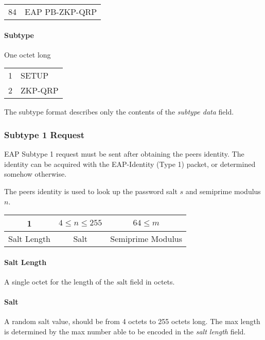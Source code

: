 \bigskip

\begin{tabular}{ll}
	84 & EAP PB-ZKP-QRP \\
\end{tabular}

\paragraph{Subtype} One octet long

\bigskip 

\begin{tabular}{ll}
	1 & SETUP \\ %
	2 & ZKP-QRP \\
\end{tabular}
\bigskip
\newline
The subtype format describes only the contents of the \textit{subtype data} field.

\subsubsection{Subtype 1 Request}

EAP Subtype 1 request must be sent after obtaining the peers identity. The identity can be acquired with the EAP-Identity (Type 1) packet, or determined somehow otherwise.

The peers identity is used to look up the password salt $s$ and semiprime modulus $n$.

\bigskip

\begin{center}
\begin{tabular}{|c|c|c|}
	\hline
	1 & $4 \le n \le 255 $ & $64 \le m$\\ %
	\hline
	Salt Length & Salt & Semiprime Modulus\\
	\hline
\end{tabular}
\end{center}

\paragraph{Salt Length}
A single octet for the length of the \textit salt field in octets. %

\paragraph{Salt}
A random salt value, should be from 4 octets to 255 octets long.
The max length is determined by the max number able to be encoded in the \textit {salt length} field.

